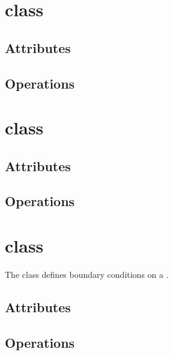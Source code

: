 \section{ class}


\subsection{Attributes}

\subsection{Operations}

\section{ class}


\subsection{Attributes}

\subsection{Operations}

\section{ class}

The  class defines boundary conditions on a .



\subsection{Attributes}

\subsection{Operations}

